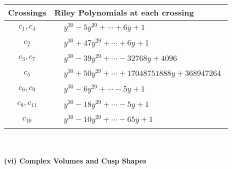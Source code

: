 \documentclass[1p]{elsarticle_modified}
\theoremstyle{definition}
\begin{document}
\begin{tabular}{m{50pt}|m{274pt}}
Crossings & \hspace{64pt}Riley Polynomials at each crossing \\
\hline $$\begin{aligned}c_{1},c_{4}\end{aligned}$$&$\begin{aligned}
&y^{30}-5 y^{29}+\cdots+6 y+1
\end{aligned}$\\
\hline $$\begin{aligned}c_{2}\end{aligned}$$&$\begin{aligned}
&y^{30}+47 y^{29}+\cdots+6 y+1
\end{aligned}$\\
\hline $$\begin{aligned}c_{3},c_{7}\end{aligned}$$&$\begin{aligned}
&y^{30}-39 y^{29}+\cdots-32768 y+4096
\end{aligned}$\\
\hline $$\begin{aligned}c_{5}\end{aligned}$$&$\begin{aligned}
&y^{30}+50 y^{29}+\cdots+17048751888 y+368947264
\end{aligned}$\\
\hline $$\begin{aligned}c_{6},c_{9}\end{aligned}$$&$\begin{aligned}
&y^{30}-6 y^{29}+\cdots-5 y+1
\end{aligned}$\\
\hline $$\begin{aligned}c_{8},c_{11}\end{aligned}$$&$\begin{aligned}
&y^{30}-18 y^{29}+\cdots-5 y+1
\end{aligned}$\\
\hline $$\begin{aligned}c_{10}\end{aligned}$$&$\begin{aligned}
&y^{30}-10 y^{29}+\cdots-65 y+1
\end{aligned}$\\
\hline
\end{tabular}\\~\\
\newpage\flushleft \textbf{(vi) Complex Volumes and Cusp Shapes}
\end{document}
